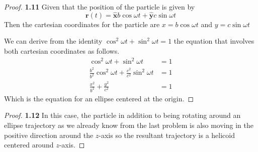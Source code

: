 \documentclass[11pt]{article}
\newcommand{\hatx}{\bm{\hat{x}}}
\newcommand{\haty}{\bm{\hat{y}}}
\begin{document}
\cleardoublepage
        \begin{proof}{\textbf{1.11}}
            Given that the position of the particle is given by
            $$\bm{r}(t) = \hatx b \cos{\omega t} + \haty c \sin{\omega t}$$
            Then the cartesian coordinates for the particle are
            $x = b \cos{\omega t}$ and $y = c \sin{\omega t}$
            
            We can derive from the identity $\cos^2{\omega t} + \sin^2{\omega t} = 1$
            the equation that involves both cartesian coordinates as follows.
            \begin{align*}
                \cos^2{\omega t} + \sin^2{\omega t} &= 1 \\
                \frac{b^2}{b^2}\cos^2{\omega t} + \frac{c^2}{c^2}\sin^2{\omega t} &= 1 \\
                \frac{x^2}{b^2} + \frac{y^2}{c^2} &= 1
            \end{align*}
            Which is the equation for an ellipse centered at the origin.
        \end{proof}
        \begin{proof}{\textbf{1.12}}
            In this case, the particle in addition to being rotating around an
            ellipse trajectory as we already know from the last problem is also
            moving in the positive direction around the $z$-axis so the
            resultant trajectory is a helicoid centered around $z$-axis.
        \end{proof}
\end{document}
